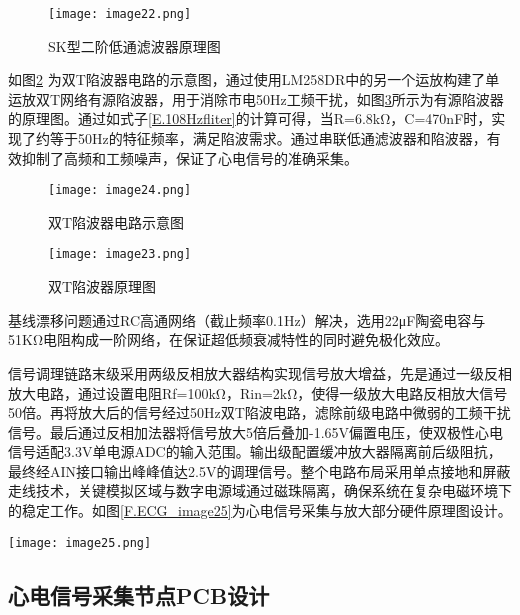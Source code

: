 \begin{figure}[hbt]
    \centering
    \texttt{[image: image22.png]}
    \caption{SK型二阶低通滤波器原理图}
    \label{F.ECG_image22}
\end{figure}

如图\ref{F.ECG_image24} \cite{新概念模拟电路3}为双T陷波器电路的示意图，通过使用LM258DR中的另一个运放构建了单运放双T网络有源陷波器，用于消除市电50Hz工频干扰，如图\ref{F.ECG_image23}所示为有源陷波器的原理图。通过如式子\ref{E.108Hzfliter}的计算可得，当R=6.8kΩ，C=470nF时，实现了约等于50Hz的特征频率，满足陷波需求。通过串联低通滤波器和陷波器，有效抑制了高频和工频噪声，保证了心电信号的准确采集。

\begin{figure}[hbt]
    \centering
    \texttt{[image: image24.png]}
    \caption{双T陷波器电路示意图}
    \label{F.ECG_image24}
\end{figure}

\begin{figure}[hbt]
    \centering
    \texttt{[image: image23.png]}
    \caption{双T陷波器原理图}
    \label{F.ECG_image23}
\end{figure}

基线漂移问题通过RC高通网络（截止频率0.1Hz）解决，选用22μF陶瓷电容与51KΩ电阻构成一阶网络，在保证超低频衰减特性的同时避免极化效应。

信号调理链路末级采用两级反相放大器结构实现信号放大增益，先是通过一级反相放大电路，通过设置电阻Rf=100kΩ，Rin=2kΩ，使得一级放大电路反相放大信号50倍。再将放大后的信号经过50Hz双T陷波电路，滤除前级电路中微弱的工频干扰信号。最后通过反相加法器将信号放大5倍后叠加-1.65V偏置电压，使双极性心电信号适配3.3V单电源ADC的输入范围。输出级配置缓冲放大器隔离前后级阻抗，最终经AIN接口输出峰峰值达2.5V的调理信号。整个电路布局采用单点接地和屏蔽走线技术，关键模拟区域与数字电源域通过磁珠隔离，确保系统在复杂电磁环境下的稳定工作。如图\ref{F.ECG_image25}为心电信号采集与放大部分硬件原理图设计。

\begin{sidewaysfigure}
    \centering
    \texttt{[image: image25.png]}
    \caption{心电信号采集与放大部分硬件原理图设计}
    \label{F.ECG_image25}
\end{sidewaysfigure}

\newpage

\subsection{心电信号采集节点PCB设计}

